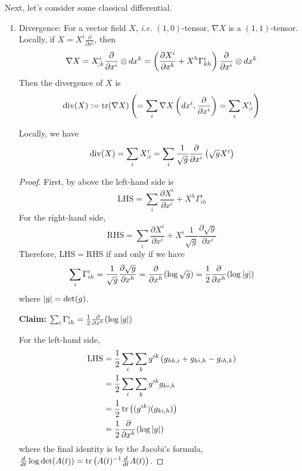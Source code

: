 Next, let's consider some classical differential.
\begin{enumerate}[label=\Roman{*}.]
	\item Divergence: For a vector field $X$, \emph{i.e.} $(1,0)$-tensor, $\nabla X$ is a $(1,1)$-tensor. Locally, if $X = X^i \frac{\partial}{\partial x^i}$, then
	\begin{equation*}
		\nabla X = X^i_{;k} \frac{\partial}{\partial x^i} \otimes dx^k = \left(\frac{\partial X^i}{\partial x^k} + X^h\Gamma^i_{kh}\right)\frac{\partial}{\partial x^i} \otimes dx^k
	\end{equation*}
	Then the divergence of $X$ is
	\begin{equation*}
		\operatorname{div}(X) \vcentcolon= \operatorname{tr} (\nabla X) \left(= \sum_i \nabla X\left(dx^i,\frac{\partial}{\partial x^i}\right) = \sum_i X^i_{;i}\right)
	\end{equation*}
	\begin{prop}
		Locally, we have
		\begin{equation*}
			\operatorname{div}(X) = \sum_i X^i_{;i} = \sum_i \frac{1}{\sqrt{g}}\frac{\partial}{\partial x^i}\left(\sqrt{g}X^i\right)
		\end{equation*}
	\end{prop}
	\begin{proof}
		First, by above the left-hand side is
		\begin{equation*}
			\text{LHS} = \sum_i\frac{\partial X^i}{\partial x^i} + X^h\Gamma^i_{ih}
		\end{equation*}
		For the right-hand side,
		\begin{equation*}
			\text{RHS} = \sum_i \frac{\partial X^i}{\partial x^i} + X^i\frac{1}{\sqrt{g}}\frac{\partial\sqrt{g}}{\partial x^i}
		\end{equation*}
		Therefore, LHS$=$RHS if and only if we have
		\begin{equation*}
			\sum_i \Gamma^i_{ih} = \frac{1}{\sqrt{g}}\frac{\partial\sqrt{g}}{\partial x^h} = \frac{\partial}{\partial x^h}(\log \sqrt{g}) =\frac{1}{2}\frac{\partial}{\partial x^h}(\log \left\lvert g\right\lvert)
		\end{equation*}
		where $\left\lvert g\right\lvert = \det(g)$.

		\noindent \textbf{Claim:} $\sum_i \Gamma^i_{ih}= \frac{1}{2}\frac{\partial}{\partial x^h}(\log \left\lvert g\right\lvert)$

		\noindent For the left-hand side,
		\begin{equation*}
			\begin{aligned}
				\text{LHS} &= \frac{1}{2}\sum_i \sum_k g^{ik}\left(g_{hk,i} + g_{ki,h} - g_{ih,k}\right) \\
				&= \frac{1}{2}\sum_i \sum_kg^{ik}g_{ki,h}\\
				&= \frac{1}{2} \operatorname{tr}\left((g^{ik})(g_{ki,h})\right) \\
				&= \frac{1}{2}\frac{\partial}{\partial x^h}(\log \left\lvert g\right\lvert)
			\end{aligned}
		\end{equation*}
		where the final identity is by the Jacobi's formula, $\frac{d}{dt}\log\det(A(t)) = \operatorname{tr}\left(A(t)^{-1}\frac{d}{dt}A(t)\right)$.
	\end{proof}


\end{enumerate}
